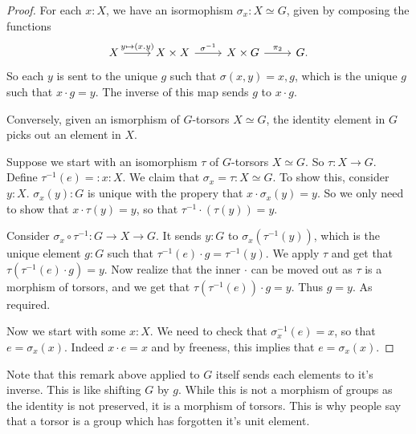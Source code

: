 \begin{proof}
\item For each $x:X$, we have an isormophism $\sigma_x:X \simeq G$, given by composing the functions $$\begin{tikzcd}
    X \arrow[r, "y \mapsto (x.y)"] & 
    X \times X \arrow[r, "\sigma^{-1}"] &
    X \times G \arrow[r,"\pi_2"]& G.
   \end{tikzcd}$$
   So each $y$ is sent to the unique $g$ such that $\sigma(x,y) = x,g$, which is the unique $g$ such that $x\cdot g = y$. 
   The inverse of this map sends $g$ to $x\cdot g$. 

 \item Conversely, given an ismorphism of $G$-torsors $X \simeq G$, the identity element in $G$ picks out an element in $X$. 

 \item Suppose we start with an isomorphism $\tau$ of $G$-torsors $X \simeq G$. 
   So $\tau: X \to G$. 
   Define $\tau^{-1}(e)=:x : X$.
   We claim that $\sigma_x = \tau : X \simeq G$. 
   To show this, consider $y:X$. 
   $\sigma_x(y): G $ is unique with the propery that $x \cdot \sigma_x(y) = y$. 
   So we only need to show that 
   $x \cdot \tau(y) = y$, 
   so that $\tau^{-1} \cdot (\tau(y)) = y$. 

   Consider $\sigma_x\circ \tau^{-1}:  G \to X \to G$. 
   It sends $y:G$ to $\sigma_x(\tau^{-1}(y))$, 
   which is the unique element 
   $g:G$ such that 
   $\tau^{-1}(e) \cdot g = \tau^{-1}(y)$. 
   We apply $\tau$ and get that 
   $\tau(\tau^{-1}(e) \cdot g) = y$. Now realize that the inner $\cdot$ can be moved out as $\tau$ is a morphism of torsors, and we get that
   $\tau(\tau^{-1}(e)) \cdot g = y$. Thus $g = y$. As required. 
 \item Now we start with some $x:X$. We need to check that $\sigma_x^{-1}(e) = x$, so that $e = \sigma_x(x)$. Indeed $x \cdot e = x$ and by freeness, this implies that $e = \sigma_x(x)$. 
   



\end{proof}
\begin{example}
  Note that this remark above applied to $G$ itself sends each elements to it's inverse. This is like shifting $G$ by $g$. While this is not a morphism of groups as the identity is not preserved, it is a morphism of torsors. This is why people say that a torsor is a group which has forgotten it's unit element. 
\end{example}
